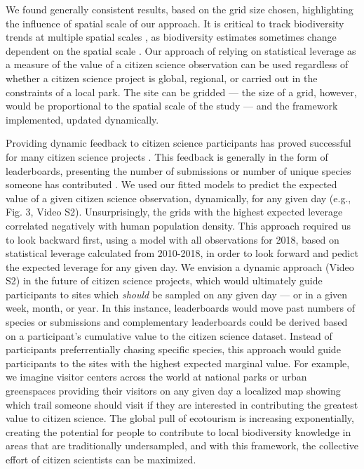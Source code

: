\documentclass[9pt,twocolumn,twoside,lineno]{pnas-new}
\begin{document}
We found generally consistent results, based on the grid size chosen, highlighting the influence of spatial scale of our approach. It is critical to track biodiversity trends at multiple spatial scales \cite{soberon2007assessing}, as biodiversity estimates sometimes change dependent on the spatial scale \cite{chase2013scale}. Our approach of relying on statistical leverage as a measure of the value of a citizen science observation can be used regardless of whether a citizen science project is global, regional, or carried out in the constraints of a local park. The site can be gridded --- the size of a grid, however, would be proportional to the spatial scale of the study --- and the framework implemented, updated dynamically.

Providing dynamic feedback to citizen science participants has proved successful for many citizen science projects \cite{rowley2019frogid, wiggins2011conservation, xue2016avicaching}. This feedback is generally in the form of leaderboards, presenting the number of submissions or number of unique species someone has contributed \cite{wood2011ebird}. We used our fitted models to predict the expected value of a given citizen science observation, dynamically, for any given day (e.g., Fig. 3, Video S2). Unsurprisingly, the grids with the highest expected leverage correlated negatively with human population density. This approach required us to look backward first, using a model with all observations for 2018, based on statistical leverage calculated from 2010-2018, in order to look forward and pedict the expected leverage for any given day. We envision a dynamic approach (Video S2) in the future of citizen science projects, which would ultimately guide participants to sites which \textit{should} be sampled on any given day --- or in a given week, month, or year. In this instance, leaderboards would move past numbers of species or submissions and complementary leaderboards could be derived based on a participant's cumulative value to the citizen science dataset. Instead of participants preferrentially chasing specific species, this approach would guide participants to the sites with the highest expected marginal value. For example, we imagine visitor centers across the world at national parks or urban greenspaces providing their visitors on any given day a localized map showing which trail someone should visit if they are interested in contributing the greatest value to citizen science. The global pull of ecotourism \cite{sharpley2006ecotourism} is increasing exponentially, creating the potential for people to contribute to local biodiversity knowledge in areas that are traditionally undersampled, and with this framework, the collective effort of citizen scientists can be maximized.
\end{document}
